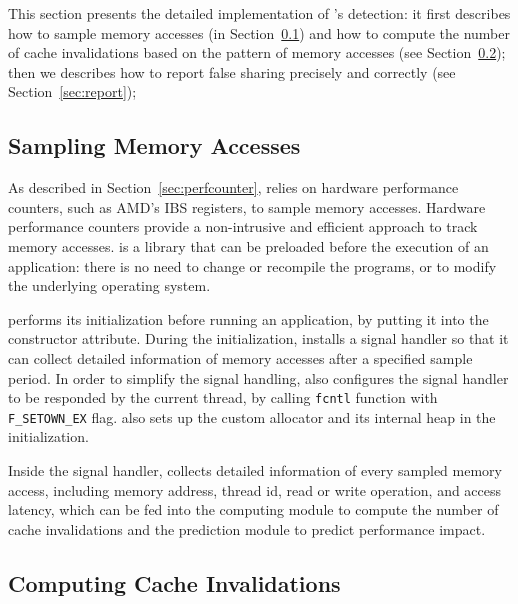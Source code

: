 \label{sec:implement}
This section presents the detailed implementation of \Cheetah{}'s detection: it first describes how to sample memory accesses (in Section~\ref{sec:detect-trace}) and how to compute the number of cache invalidations based on the pattern of memory accesses (see Section~\ref{sec:compute}); then we describes how to report false sharing precisely and correctly (see Section~\ref{sec:report});


\subsection{Sampling Memory Accesses}
\label{sec:detect-trace}

As described in Section~\ref{sec:perfcounter}, \Cheetah{} relies on hardware performance counters, such as AMD's IBS registers, to sample memory accesses. Hardware performance counters provide a non-intrusive and efficient approach to track memory accesses. \Cheetah{} is a library that can be preloaded before the execution of an application: there is no need to change or recompile the programs, or to modify the underlying operating system. 

\cheetah{} performs its initialization before running an application, by putting it into the constructor attribute. During the initialization, \Cheetah{} installs a signal handler so that it can collect detailed information of memory accesses after a specified sample period. In order to simplify the signal handling, \Cheetah{} also configures the signal handler to be responded by the current thread, by calling \texttt{fcntl} function with \texttt{F\_SETOWN\_EX} flag. \cheetah{} also sets up the custom allocator and its internal heap in the initialization.  

Inside the signal handler, \Cheetah{} collects detailed information of every sampled memory access, including memory address, thread id, read or write operation, and access latency, which can be fed into the computing module to compute the number of cache invalidations and the prediction module to predict performance impact. 

\subsection{Computing Cache Invalidations}
\label{sec:compute}

